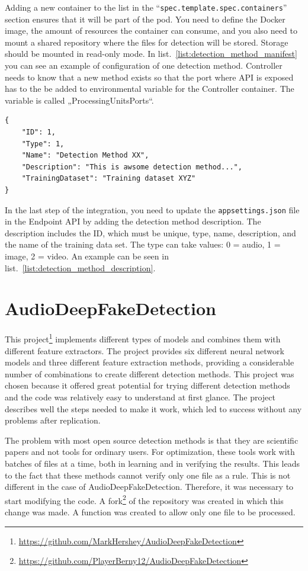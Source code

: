 Adding a new container to the list in the “\texttt{spec.template.spec.containers}” section ensures that it will be part of the pod. You need to define the Docker image, the amount of resources the container can consume, and you also need to mount a shared repository where the files for detection will be stored. Storage should be mounted in read-only mode. In list.~\ref{list:detection_method_manifest} you can see an example of configuration of one detection method. Controller needs to know that a new method exists so that the port where API is exposed has to the be added to environmental variable for the Controller container. The variable is called „ProcessingUnitsPorts“.

\begin{lstlisting}[caption={Detection method description in appsettings.json},label={list:detection_method_description}]
{
    "ID": 1,
    "Type": 1,
    "Name": "Detection Method XX",
    "Description": "This is awsome detection method...",
    "TrainingDataset": "Training dataset XYZ"
}
\end{lstlisting}

In the last step of the integration, you need to update the \texttt{appsettings.json} file in the Endpoint API by adding the detection method description. The description includes the ID, which must be unique, type, name, description, and the name of the training data set. The type can take values: 0 = audio, 1 = image, 2 = video. An example can be seen in list.~\ref{list:detection_method_description}.
\section{AudioDeepFakeDetection}

This project\footnote{\url{https://github.com/MarkHershey/AudioDeepFakeDetection}} implements different types of models and combines them with different feature extractors. The project provides six different neural network models and three different feature extraction methods, providing a considerable number of combinations to create different detection methods. This project was chosen because it offered great potential for trying different detection methods and the code was relatively easy to understand at first glance. The project describes well the steps needed to make it work, which led to success without any problems after replication.

The problem with most open source detection methods is that they are scientific papers and not tools for ordinary users. For optimization, these tools work with batches of files at a time, both in learning and in verifying the results. This leads to the fact that these methods cannot verify only one file as a rule. This is not different in the case of AudioDeepFakeDetection. Therefore, it was necessary to start modifying the code. A fork\footnote{\url{https://github.com/PlayerBerny12/AudioDeepFakeDetection}} of the repository was created in which this change was made. A function was created to allow only one file to be processed.

